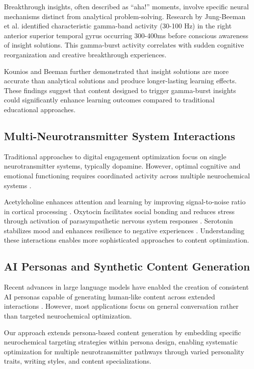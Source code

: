 \documentclass[11pt,letterpaper]{article}
\begin{document}
Breakthrough insights, often described as ``aha!'' moments, involve specific neural mechanisms distinct from analytical problem-solving. Research by Jung-Beeman et al. \cite{jung2004} identified characteristic gamma-band activity (30-100 Hz) in the right anterior superior temporal gyrus occurring 300-400ms before conscious awareness of insight solutions. This gamma-burst activity correlates with sudden cognitive reorganization and creative breakthrough experiences.

Kounios and Beeman \cite{kounios2014} further demonstrated that insight solutions are more accurate than analytical solutions and produce longer-lasting learning effects. These findings suggest that content designed to trigger gamma-burst insights could significantly enhance learning outcomes compared to traditional educational approaches.

\subsection{Multi-Neurotransmitter System Interactions}

Traditional approaches to digital engagement optimization focus on single neurotransmitter systems, typically dopamine. However, optimal cognitive and emotional functioning requires coordinated activity across multiple neurochemical systems \cite{robbins2009}.

Acetylcholine enhances attention and learning by improving signal-to-noise ratio in cortical processing \cite{hasselmo2006}. Oxytocin facilitates social bonding and reduces stress through activation of parasympathetic nervous system responses \cite{carter2014}. Serotonin stabilizes mood and enhances resilience to negative experiences \cite{stellar2015}. Understanding these interactions enables more sophisticated approaches to content optimization.

\subsection{AI Personas and Synthetic Content Generation}

Recent advances in large language models have enabled the creation of consistent AI personas capable of generating human-like content across extended interactions \cite{brown2020}. However, most applications focus on general conversation rather than targeted neurochemical optimization.

Our approach extends persona-based content generation by embedding specific neurochemical targeting strategies within persona design, enabling systematic optimization for multiple neurotransmitter pathways through varied personality traits, writing styles, and content specializations.
\end{document}
